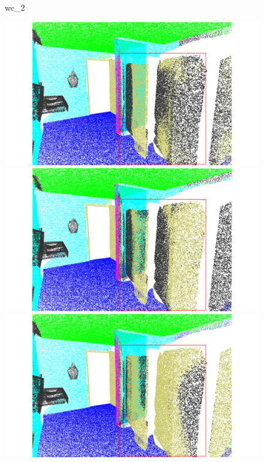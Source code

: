 \begin{figure}[htbp]
    \begin{minipage}{0.09\textwidth}
        \centering
        wc\_2
    \end{minipage}
    \hfill
    \begin{minipage}{0.17\textwidth}
        \centering
        \includegraphics[width=\textwidth]{fig/supplement/semantic_segmentation/wc_2/DAPT_wc_2.pdf}
    \end{minipage}
    \hfill
    \begin{minipage}{0.17\textwidth}
        \centering
        \includegraphics[width=\textwidth]{fig/supplement/semantic_segmentation/wc_2/IDPT_wc_2.pdf} %
    \end{minipage}
    \hfill
    \begin{minipage}{0.17\textwidth}
        \centering
        \includegraphics[width=\textwidth]{fig/supplement/semantic_segmentation/wc_2/PointGST_wc_2.pdf}

\end{minipage}
\end{figure}
